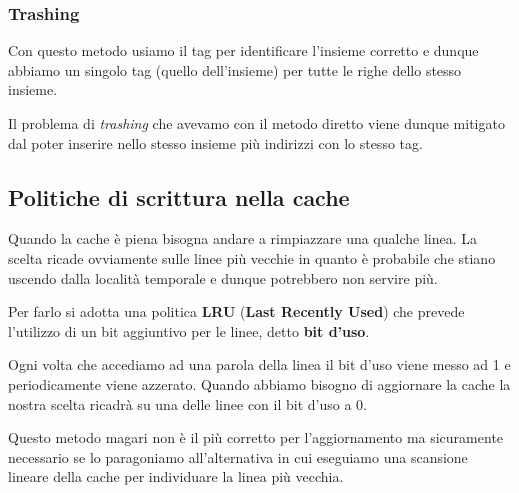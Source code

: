 \subsubsection{Trashing}
Con questo metodo usiamo il tag per identificare l'insieme corretto e dunque abbiamo un singolo tag
(quello dell'insieme) per tutte le righe dello stesso insieme.

Il problema di \emph{trashing} che avevamo con il metodo diretto viene dunque mitigato dal poter
inserire nello stesso insieme più indirizzi con lo stesso tag.

\subsection{Politiche di scrittura nella cache}
Quando la cache è piena bisogna andare a rimpiazzare una qualche linea. La scelta ricade ovviamente
sulle linee più vecchie in quanto è probabile che stiano uscendo dalla località temporale e dunque
potrebbero non servire più.

Per farlo si adotta una politica \textbf{LRU} (\textbf{Last Recently Used}) che prevede l'utilizzo
di un bit aggiuntivo per le linee, detto \textbf{bit d'uso}.

Ogni volta che accediamo ad una parola della linea il bit d'uso viene messo ad 1 e periodicamente
viene azzerato. Quando abbiamo bisogno di aggiornare la cache la nostra scelta ricadrà su una delle
linee con il bit d'uso a 0.

Questo metodo magari non è il più corretto per l'aggiornamento ma sicuramente necessario se lo
paragoniamo all'alternativa in cui eseguiamo una scansione lineare della cache per individuare la
linea più vecchia.
